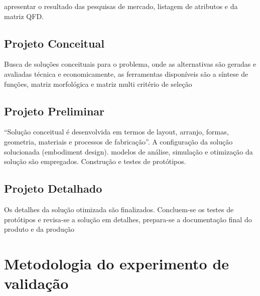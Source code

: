 apresentar o resultado das pesquisas de mercado, listagem de atributos e da matriz QFD.

\subsection{Projeto Conceitual}

Busca de soluções conceituais para o problema, onde as alternativas são geradas e avaliadas técnica e economicamente, as ferramentas disponíveis são a síntese de funções, matriz morfológica e matriz multi critério de seleção

\subsection{Projeto Preliminar}

“Solução conceitual é desenvolvida em termos de layout, arranjo, formas, geometria, materiais e processos de fabricação”. A configuração da solução solucionada (embodiment design). modelos de análise, simulação e otimização da solução são empregados. Construção e testes de protótipos.

\subsection{Projeto Detalhado}

Os detalhes da solução otimizada são finalizados. Concluem-se os testes de protótipos e revisa-se a solução em detalhes, prepara-se a documentação final do produto e da produção

\section{Metodologia do experimento de validação}


